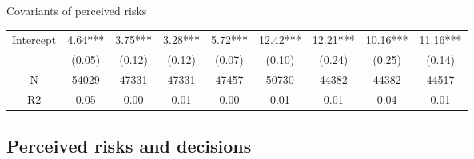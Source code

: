 \documentclass{beamer}
\begin{document}
\begin{frame}{Covariants of perceived risks}
\begin{table}
{\begin{tabular}{ccccccccc}
	Intercept        &  4.64*** &   3.75*** &    3.28*** &     5.72*** &  12.42*** &   12.21*** &    10.16*** &     11.16*** \\
	&   (0.05) &    (0.12) &     (0.12) &      (0.07) &    (0.10) &     (0.24) &      (0.25) &       (0.14) \\
	\hline 
	N                &    54029 &     47331 &      47331 &       47457 &     50730 &      44382 &       44382 &        44517 \\
	R2               &     0.05 &      0.00 &       0.01 &        0.00 &      0.01 &       0.01 &        0.04 &         0.01 \\
	\hline 
\end{tabular}
}
	\end{table}
\end{frame}


\subsection{Perceived risks and decisions}
\end{document}

